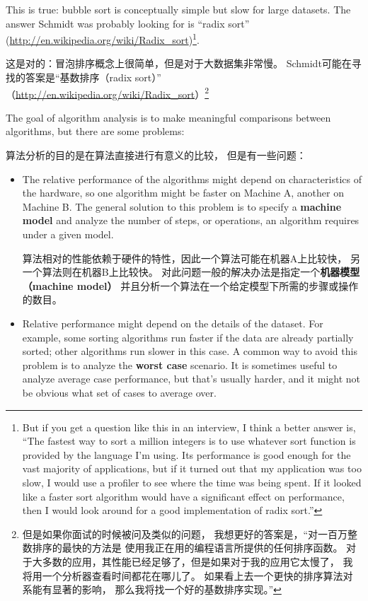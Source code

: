 \documentclass[10pt]{book}
\begin{document}
\begin{CJK}{UTF8}{gbsn}
This is true: bubble sort is conceptually simple but slow for
large datasets.  The answer Schmidt was probably looking for is
``radix sort'' (\url{http://en.wikipedia.org/wiki/Radix_sort})\footnote{
But if you get a question like this in an interview, I think
a better answer is, ``The fastest way to sort a million integers
is to use whatever sort function is provided by the language
I'm using.  Its performance is good enough for the vast majority
of applications, but if it turned out that my application was too
slow, I would use a profiler to see where the time was being
spent.  If it looked like a faster sort algorithm would have
a significant effect on performance, then I would look
around for a good implementation of radix sort.''}.

这是对的：冒泡排序概念上很简单，但是对于大数据集非常慢。
Schmidt可能在寻找的答案是``基数排序（radix sort）''
（\url{http://en.wikipedia.org/wiki/Radix_sort}）\footnote{
但是如果你面试的时候被问及类似的问题，
我想更好的答案是，``对一百万整数排序的最快的方法是
使用我正在用的编程语言所提供的任何排序函数。
对于大多数的应用，其性能已经足够了，但是如果对于我的应用它太慢了，
我将用一个分析器查看时间都花在哪儿了。
如果看上去一个更快的排序算法对系能有显著的影响，
那么我将找一个好的基数排序实现。''}

The goal of algorithm analysis is to make meaningful
comparisons between algorithms, but there are some problems:

算法分析的目的是在算法直接进行有意义的比较，
但是有一些问题：

\begin{itemize}

\item The relative performance of the algorithms might
depend on characteristics of the hardware, so one algorithm
might be faster on Machine A, another on Machine B.
The general solution to this problem is to specify a
{\bf machine model} and analyze the number of steps, or
operations, an algorithm requires under a given model.

算法相对的性能依赖于硬件的特性，因此一个算法可能在机器A上比较快，
另一个算法则在机器B上比较快。
对此问题一般的解决办法是指定一个{\bf 机器模型（machine model）}
并且分析一个算法在一个给定模型下所需的步骤或操作的数目。

\item Relative performance might depend on the details of
the dataset.  For example, some sorting
algorithms run faster if the data are already partially sorted;
other algorithms run slower in this case.
A common way to avoid this problem is to analyze the
{\bf worst case} scenario.  It is sometimes useful to
analyze average case performance, but that's usually harder,
and it might not be obvious what set of cases to average over.


\end{itemize}
\end{CJK}
\end{document}
